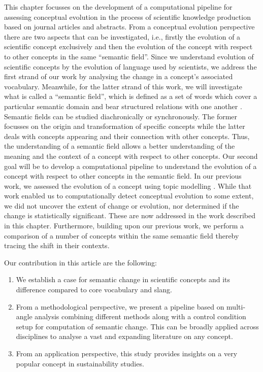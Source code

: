 \documentclass[output=paper]{langsci/langscibook}
\begin{document}
This chapter focusses on the development of a computational pipeline for assessing conceptual evolution in the process of scientific knowledge production based on journal articles and abstracts. From a conceptual evolution perspective there are two aspects that can be investigated, i.e., firstly the evolution of a scientific concept exclusively and then the evolution of the concept with respect to other concepts in the same ``semantic field''. Since we understand evolution of scientific concepts by the evolution of language used by scientists, we address the first strand of our work by analysing the change in a concept's associated vocabulary. Meanwhile, for the latter strand of this work, we will investigate what is called a ``semantic field'', which is defined as a set of words which cover a particular semantic domain and bear structured relations with one another \citep{jurasky2000speech}. 
Semantic fields can be studied diachronically or synchronously. The former focusses on  the origin and transformation of specific concepts while the latter deals with concepts appearing and their connection with other concepts. Thus, the understanding of a semantic field allows a better understanding of the meaning and the context of a concept with respect to other concepts. Our second goal will be to develop a computational pipeline to understand the evolution of a concept with respect to other concepts in the semantic field. In our previous work, we assessed the evolution of a concept using topic modelling \citep{mahanty2019studying}.  While that work enabled us to computationally detect conceptual evolution to some extent, we did not uncover the extent of change or evolution, nor determined if the change is statistically significant. These are now addressed in the work described in this chapter. Furthermore, building upon our previous work, we perform a comparison of a number of concepts within the same semantic field thereby tracing the shift in their contexts. 

Our contribution in this article are the following:

\begin{enumerate}[label=\alph*.]
\item We establish a case for semantic change in scientific concepts and its difference compared to core vocabulary and slang.
\item From a methodological perspective, we present a pipeline based on multi-angle analysis combining different methods along with a control condition setup for computation of semantic change. This can be broadly applied across disciplines to analyse a vast and expanding literature on any concept.
\item From an application perspective, this study provides insights on a very popular concept in sustainability studies.
\end{enumerate}
\end{document}
